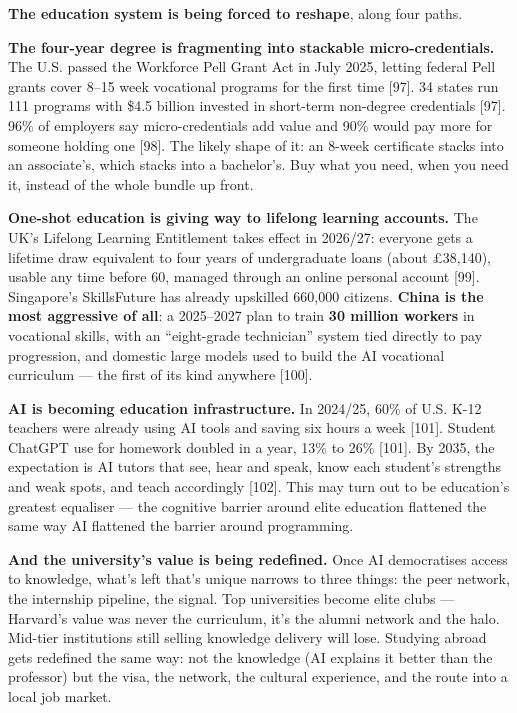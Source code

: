\documentclass[11pt,a4paper]{article}
\begin{document}
\textbf{The education system is being forced to reshape}, along four paths.

\textbf{The four-year degree is fragmenting into stackable micro-credentials.} The U.S. passed the Workforce Pell Grant Act in July 2025, letting federal Pell grants cover 8--15 week vocational programs for the first time [97]. 34 states run 111 programs with \$4.5 billion invested in short-term non-degree credentials [97]. 96\% of employers say micro-credentials add value and 90\% would pay more for someone holding one [98]. The likely shape of it: an 8-week certificate stacks into an associate's, which stacks into a bachelor's. Buy what you need, when you need it, instead of the whole bundle up front.

\textbf{One-shot education is giving way to lifelong learning accounts.} The UK's Lifelong Learning Entitlement takes effect in 2026/27: everyone gets a lifetime draw equivalent to four years of undergraduate loans (about £38,140), usable any time before 60, managed through an online personal account [99]. Singapore's SkillsFuture has already upskilled 660,000 citizens. \textbf{China is the most aggressive of all}: a 2025--2027 plan to train \textbf{30 million workers} in vocational skills, with an ``eight-grade technician'' system tied directly to pay progression, and domestic large models used to build the AI vocational curriculum --- the first of its kind anywhere [100].

\textbf{AI is becoming education infrastructure.} In 2024/25, 60\% of U.S. K-12 teachers were already using AI tools and saving six hours a week [101]. Student ChatGPT use for homework doubled in a year, 13\% to 26\% [101]. By 2035, the expectation is AI tutors that see, hear and speak, know each student's strengths and weak spots, and teach accordingly [102]. This may turn out to be education's greatest equaliser --- the cognitive barrier around elite education flattened the same way AI flattened the barrier around programming.

\textbf{And the university's value is being redefined.} Once AI democratises access to knowledge, what's left that's unique narrows to three things: the peer network, the internship pipeline, the signal. Top universities become elite clubs --- Harvard's value was never the curriculum, it's the alumni network and the halo. Mid-tier institutions still selling knowledge delivery will lose. Studying abroad gets redefined the same way: not the knowledge (AI explains it better than the professor) but the visa, the network, the cultural experience, and the route into a local job market.
\end{document}
